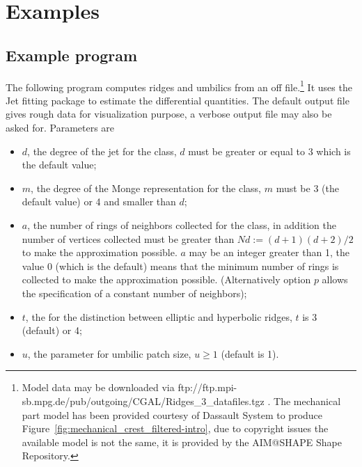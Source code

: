 \section{Examples}

\label{examples}

\subsection{Example program}
The following program computes ridges and umbilics from an off
file.\footnote{Model data may be downloaded via
  ftp://ftp.mpi-sb.mpg.de/pub/outgoing/CGAL/Ridges\_3\_datafiles.tgz .
  The mechanical part model has been provided courtesy of Dassault
  System to produce Figure~\ref{fig:mechanical_crest_filtered-intro},
  due to copyright issues the available model is not the same, it is
  provided by the AIM@SHAPE Shape Repository.} It uses the Jet fitting package to estimate the differential
quantities. 
The default output file gives rough data for visualization purpose, a
verbose output file may also be asked for.  Parameters are
\begin{itemize}
\item
$d$, the degree of the jet for the  class, $d$
must be greater or equal to 3 which is the default value;
\item
$m$, the degree of the Monge representation for the
 class, $m$ must be 3 (the default value) or
4 and smaller than $d$;
\item
$a$, the number of rings of neighbors collected for the
 class, in addition the number of vertices
collected must be greater than $Nd:=(d+1)(d+2)/2$ to make the
approximation possible. $a$ may be an integer greater than 1, the value
0 (which is the default) means that the minimum number of rings is
collected to make the approximation possible. (Alternatively option $p$
allows the specification of a constant number of neighbors);
\item
$t$, the  for the distinction between elliptic and
hyperbolic ridges, $t$ is 3 (default) or 4;
\item
$u$, the parameter for umbilic patch size, $u \geq 1$ (default is 1).
\end{itemize}

